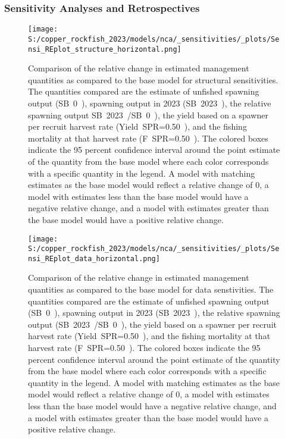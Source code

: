 \documentclass[11pt,
  letterpaper,
]{article}
\begin{document}
\clearpage

\subsubsection{Sensitivity Analyses and Retrospectives}\label{sensitivity-analyses-and-retrospectives}

\begin{figure}
{\centering
\texttt{[image: S:/copper\_rockfish\_2023/models/nca/\_sensitivities/\_plots/Sensi\_REplot\_structure\_horizontal.png]}
}
\caption{Comparison of the relative change in estimated management quantities as compared to the 
base model for structural sensitivities. The quantities compared are the estimate of unfished 
spawning output (SB~0~), spawning output in 2023 (SB~2023~), the relative spawning output 
SB~2023~/SB~0~), the yield based on a spawner per recruit harvest rate (Yield~SPR=0.50~),
and the fishing mortality at that harvest rate (F~SPR=0.50~). The colored boxes indicate the 95 percent confidence interval around the point estimate of the quantity from the base model where each color corresponds with a specific quantity in the legend. A model with matching estimates as the base model would reflect a relative change of 0, a model with estimates less than the base model would have a negative relative change, and a model with estimates greater than the base model would have a positive relative change.\label{fig:sens-structure}}
\end{figure}

\newpage

\begin{figure}
{\centering
\texttt{[image: S:/copper\_rockfish\_2023/models/nca/\_sensitivities/\_plots/Sensi\_REplot\_data\_horizontal.png]}
}
\caption{Comparison of the relative change in estimated management quantities as compared to the 
base model for data senstivities. The quantities compared are the estimate of unfished spawning 
output (SB~0~), spawning output in 2023 (SB~2023~), the relative spawning output (SB~2023~/SB~0~), 
the yield based on a spawner per recruit harvest rate (Yield~SPR=0.50~), and the fishing mortality at that harvest rate (F~SPR=0.50~). The colored boxes indicate the 95 percent confidence interval around the point estimate of the quantity from the base model where each color corresponds with a specific quantity in the legend. A model with matching estimates as the base model would reflect a relative change of 0, a model with estimates less than the base model would have a negative relative change, and a model with estimates greater than the base model would have a positive relative change.\label{fig:sens-data}}
\end{figure}
\end{document}
